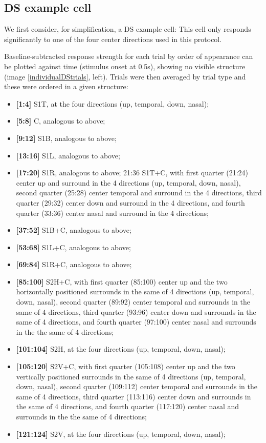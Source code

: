 \subsection{DS example cell}
\label{DSexamplecell}

We first consider, for simplification, a DS example cell: This cell only responds significantly to one of the four center directions used in this protocol.

Baseline-subtracted response strength for each trial by order of appearance can be plotted against time (stimulus onset at 0.5s), showing no visible structure (image \ref{individualDStrials}, left). 
Trials were then averaged by trial type and these were ordered in a given structure:

\begin{itemize}
\item \textbf{[1:4]} S1T, at the four directions (up, temporal, down, nasal); 
\item \textbf{[5:8]} C, analogous to above; 
\item \textbf{[9:12]} S1B, analogous to above;
\item \textbf{[13:16]} S1L, analogous to above;
\item \textbf{[17:20]} S1R, analogous to above; 
21:36 S1T+C, with first quarter (21:24) center up and surround in the 4 directions (up, temporal, down, nasal), second quarter (25:28) center temporal and surround in the 4 directions, third quarter (29:32) center down and surround in the 4 directions, and fourth quarter (33:36) center nasal and surround in the 4 directions;
\item \textbf{[37:52]} S1B+C, analogous to above;
\item \textbf{[53:68]} S1L+C, analogous to above;
\item \textbf{[69:84]} S1R+C, analogous to above;
\item \textbf{[85:100]} S2H+C, with first quarter (85:100) center up and the two horizontally positioned surrounds in the same of 4 directions (up, temporal, down, nasal), second quarter (89:92) center temporal and surrounds in the same of 4 directions, third quarter (93:96) center down and surrounds in the same of 4 directions, and fourth quarter (97:100) center nasal and surrounds in the the same of 4 directions;
\item \textbf{[101:104]} S2H, at the four directions (up, temporal, down, nasal);
\item \textbf{[105:120]} S2V+C, with first quarter (105:108) center up and the two vertically positioned surrounds in the same of 4 directions (up, temporal, down, nasal), second quarter (109:112) center temporal and surrounds in the same of 4 directions, third quarter (113:116) center down and surrounds in the same of 4 directions, and fourth quarter (117:120) center nasal and surrounds in the the same of 4 directions;
\item \textbf{[121:124]} S2V, at the four directions (up, temporal, down, nasal);
\end{itemize}

